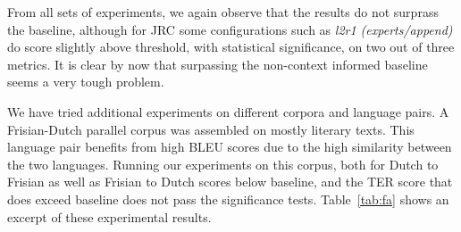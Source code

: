 From all sets of experiments, we again observe that the results do not surprass
the baseline, although for JRC some configurations such as \emph{l2r1
\footnotesize{(experts/append)}} do score slightly above threshold, with statistical
significance, on two out of three metrics. It is clear by now that surpassing the
non-context informed baseline seems a very tough problem.

We have tried additional experiments on different corpora and language pairs. A
Frisian-Dutch parallel corpus was assembled on mostly literary texts. This
language pair benefits from high BLEU scores due to the high similarity between
the two languages. Running our experiments on this corpus, both for Dutch to
Frisian as well as Frisian to Dutch scores below baseline, and the TER score
that does exceed baseline does not pass the significance tests.
Table~\ref{tab:fa} shows an excerpt of these experimental results.

\begin{table}
\noindent{}
\caption{An excerpt of the results on the Frisian parallel corpus, Dutch to Frisian and Frisian to Dutch. For the latter, no METEOR scores are available} %
\label{tab:fa}
\end{table}

